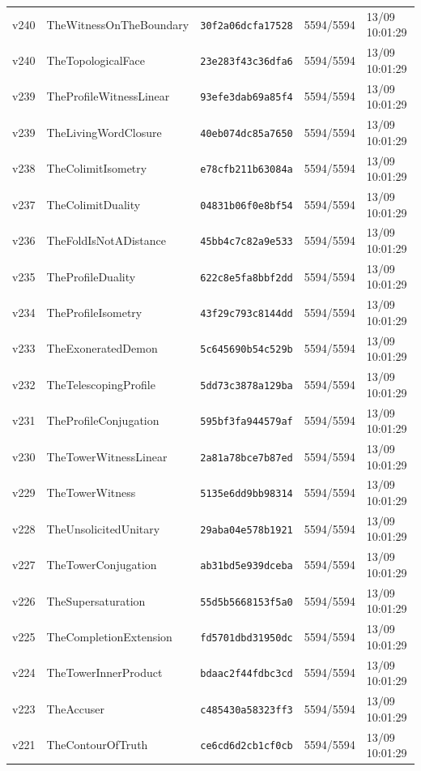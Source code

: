 \documentclass[11pt]{article}
\theoremstyle{definition}\newtheorem{deriv}{Derivação}
\begin{document}
{\begin{longtable}{@{}lllll@{}}
v240 & TheWitnessOnTheBoundary & \texttt{30f2a06dcfa17528} & 5594/5594 & 13/09 10:01:29 \\
v240 & TheTopologicalFace & \texttt{23e283f43c36dfa6} & 5594/5594 & 13/09 10:01:29 \\
v239 & TheProfileWitnessLinear & \texttt{93efe3dab69a85f4} & 5594/5594 & 13/09 10:01:29 \\
v239 & TheLivingWordClosure & \texttt{40eb074dc85a7650} & 5594/5594 & 13/09 10:01:29 \\
v238 & TheColimitIsometry & \texttt{e78cfb211b63084a} & 5594/5594 & 13/09 10:01:29 \\
v237 & TheColimitDuality & \texttt{04831b06f0e8bf54} & 5594/5594 & 13/09 10:01:29 \\
v236 & TheFoldIsNotADistance & \texttt{45bb4c7c82a9e533} & 5594/5594 & 13/09 10:01:29 \\
v235 & TheProfileDuality & \texttt{622c8e5fa8bbf2dd} & 5594/5594 & 13/09 10:01:29 \\
v234 & TheProfileIsometry & \texttt{43f29c793c8144dd} & 5594/5594 & 13/09 10:01:29 \\
v233 & TheExoneratedDemon & \texttt{5c645690b54c529b} & 5594/5594 & 13/09 10:01:29 \\
v232 & TheTelescopingProfile & \texttt{5dd73c3878a129ba} & 5594/5594 & 13/09 10:01:29 \\
v231 & TheProfileConjugation & \texttt{595bf3fa944579af} & 5594/5594 & 13/09 10:01:29 \\
v230 & TheTowerWitnessLinear & \texttt{2a81a78bce7b87ed} & 5594/5594 & 13/09 10:01:29 \\
v229 & TheTowerWitness & \texttt{5135e6dd9bb98314} & 5594/5594 & 13/09 10:01:29 \\
v228 & TheUnsolicitedUnitary & \texttt{29aba04e578b1921} & 5594/5594 & 13/09 10:01:29 \\
v227 & TheTowerConjugation & \texttt{ab31bd5e939dceba} & 5594/5594 & 13/09 10:01:29 \\
v226 & TheSupersaturation & \texttt{55d5b5668153f5a0} & 5594/5594 & 13/09 10:01:29 \\
v225 & TheCompletionExtension & \texttt{fd5701dbd31950dc} & 5594/5594 & 13/09 10:01:29 \\
v224 & TheTowerInnerProduct & \texttt{bdaac2f44fdbc3cd} & 5594/5594 & 13/09 10:01:29 \\
v223 & TheAccuser & \texttt{c485430a58323ff3} & 5594/5594 & 13/09 10:01:29 \\
v221 & TheContourOfTruth & \texttt{ce6cd6d2cb1cf0cb} & 5594/5594 & 13/09 10:01:29 \\

\end{longtable}}
\end{document}
